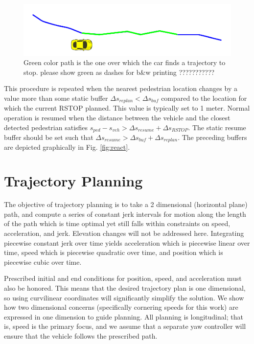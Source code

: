 \documentclass[letterpaper, 10 pt, conference]{ieeeconf}  %
\begin{document}
\begin{figure}[thpb]
  \centering
  \includegraphics[width=1.0\columnwidth]{graphics/RSTOP_path_truncation.png}
  \caption{Green color path is the one over which the car finds a trajectory to stop. please show green as dashes for b\&w printing ??????????? }
  \label{fig:pathtostop}
\end{figure}

This procedure is repeated when the nearest pedestrian location changes by a value more than some static buffer $\Delta s_{replan} < \Delta s_{buf}$ compared to the location for which the current RSTOP planned.
This value is typically set to 1 meter.
Normal operation is resumed when the distance between the vehicle and the closest detected pedestrian satisfies $s_{ped} - s_{veh} > \Delta s_{resume} + \Delta s_{RSTOP}$. The static resume buffer should be set such that $\Delta s_{resume} > \Delta s_{buf} + \Delta s_{replan}$.
The preceding buffers are depicted graphically in Fig. \ref{fig:react}.


\section{Trajectory Planning} \label{sec:trajectoryplanning}

The objective of trajectory planning is to take a 2 dimensional (horizontal plane) path, and compute a series of constant jerk intervals for motion along the length of the path which is time optimal yet still falls within constraints on speed, acceleration, and jerk.
Elevation changes will not be addressed here.
Integrating piecewise constant jerk over time yields acceleration which is piecewise linear over time, speed which is piecewise quadratic over time, and position which is piecewise cubic over time.

Prescribed initial and end conditions for position, speed, and acceleration must also be honored.
This means that the desired trajectory plan is one dimensional, so using curvilinear coordinates will significantly simplify the solution.
We show how two dimensional concerns (specifically cornering speeds for this work) are expressed in one dimension to guide planning.
All planning is longitudinal; that is, speed is the primary focus, and we assume that a separate yaw controller will ensure that the vehicle follows the prescribed path.
\end{document}
